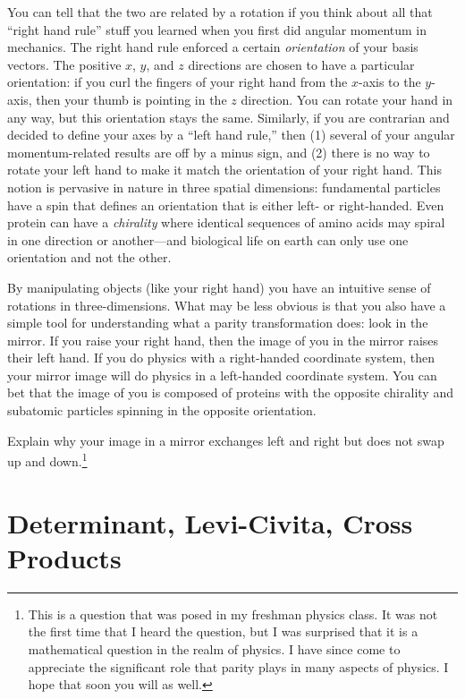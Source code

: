 \documentclass[12pt, oneside]{report}    %
\begin{document}
\begin{subappendices}
You can tell that the two are related by a rotation if you think about all that ``right hand rule'' stuff you learned when you first did angular momentum in mechanics. The right hand rule enforced a certain \emph{orientation} of your basis vectors. The positive $x$, $y$, and $z$ directions are chosen to have a particular orientation: if you curl the fingers of your right hand from the $x$-axis to the $y$-axis, then your thumb is pointing in the $z$ direction. You can rotate your hand in any way, but this orientation stays the same. Similarly, if you are contrarian and decided to define your axes by a ``left hand rule,'' then (1) several of your angular momentum-related results are off by a minus sign, and (2) there is no way to rotate your left hand to make it match the orientation of your right hand. This notion is pervasive in nature in three spatial dimensions: fundamental particles have a spin that defines an orientation that is either left- or right-handed. Even protein can have a \emph{chirality} where identical sequences of amino acids may spiral in one direction or another---and biological life on earth can only use one orientation and not the other. 

By manipulating objects (like your right hand) you have an intuitive sense of rotations in three-dimensions. What may be less obvious is that you also have a simple tool for understanding what a parity transformation does: look in the mirror. If you raise your right hand, then the image of you in the mirror raises their left hand. If you do physics with a right-handed coordinate system, then your mirror image will do physics in a left-handed coordinate system. You can bet that the image of you is composed of proteins with the opposite chirality and subatomic particles spinning in the opposite orientation. 
\begin{exercise}
Explain why your image in a mirror exchanges left and right but does not swap up and down.\footnote{This is a question that was posed in my freshman physics class. It was not the first time that I heard the question, but I was surprised that it is a mathematical question in the realm of physics. I have since come to appreciate the significant role that parity plays in many aspects of physics. I hope that soon you will as well.}
\end{exercise}



\end{subappendices}


\chapter{Determinant, Levi-Civita, Cross Products}
\label{ch:determinant}
\end{document}
